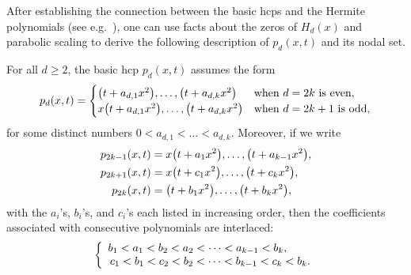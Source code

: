 \documentclass[AHL,Unicode,longabstracts,published]{cedram}
\let\originalleft\left
\let\originalright\right
\renewcommand{\left}{\mathopen{}\mathclose\bgroup\originalleft}
\renewcommand{\right}{\aftergroup\egroup\originalright}
\begin{document}
After establishing the connection between the basic hcps and the Hermite polynomials (see e.g.~\cite{Chen98,KPS21,RW59}), one can use facts about the zeros of $H_d(x)$ and parabolic scaling to derive the following description of $p_d(x,t)$ and its nodal set.

\begin{prop}\label{lem:hcp_dim_1}
For all $d\geq 2$, the basic hcp $p_d(x,t)$ assumes the form
\begin{equation}\label{pd-factor}
p_{d}(x,t) =
\begin{cases}
\left(t+a_{d,1}x^2\right),\dots, \left(t+ a_{d,k}x^2\right) &\text{when $d=2k$ is even},\\
x\left(t+a_{d,1}x^2\right),\dots,\left(t+a_{d,k}x^2\right) & \text{when $d=2k+1$ is odd},
\end{cases}
\end{equation}
for some distinct numbers $0<a_{d,1}<\dots<a_{d,k}$. Moreover, if we write
\begin{align*}
p_{2k-1}(x,t)&=x\left(t+a_1x^2\right),\dots,\left(t+a_{k-1}x^2\right),\\ p_{2k+1}(x,t)&=x\left(t+c_1x^2\right),\dots,\left(t+c_kx^2\right),
\\
p_{2k}(x,t)&=\left(t+b_1x^2\right),\dots,\left(t+b_kx^2\right),
\end{align*}
with the $a_i$\!'s, $b_i$\!'s, and $c_i$\!'s each listed in increasing order, then the coefficients associated with consecutive polynomials are interlaced:
\begin{equation}\label{pd-interlace}
\left\{
\begin{array}{l}
b_1<a_1<b_2<a_2<\dots<a_{k-1}<b_k,\\
\,c_1<b_1<c_2<b_2<\dots<b_{k-1}<c_k<b_k.
\end{array}\right.
\end{equation}
\end{prop}
\end{document}
